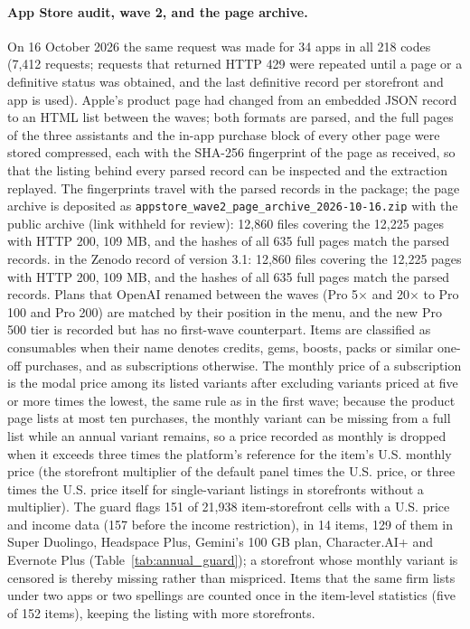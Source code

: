 \documentclass[11pt]{article}
\theoremstyle{definition}
\theoremstyle{remark}
\begin{document}
\paragraph{App Store audit, wave 2, and the page archive.} On 16 October 2026 the same request was made for 34 apps in all 218 codes (7,412 requests; requests that returned HTTP 429 were repeated until a page or a definitive status was obtained, and the last definitive record per storefront and app is used). Apple's product page had changed from an embedded JSON record to an HTML list between the waves; both formats are parsed, and the full pages of the three assistants and the in-app purchase block of every other page were stored compressed, each with the SHA-256 fingerprint of the page as received, so that the listing behind every parsed record can be inspected and the extraction replayed. The fingerprints travel with the parsed records in the package; the page archive is deposited as \texttt{appstore\_wave2\_page\_archive\_2026-10-16.zip}
\ifanon
with the public archive (link withheld for review): 12,860 files covering the 12,225 pages with HTTP 200, 109 MB, and the hashes of all 635 full pages match the parsed records.
\else
in the Zenodo record of version 3.1: 12,860 files covering the 12,225 pages with HTTP 200, 109 MB, and the hashes of all 635 full pages match the parsed records.
\fi
Plans that OpenAI renamed between the waves (Pro 5$\times$ and 20$\times$ to Pro 100 and Pro 200) are matched by their position in the menu, and the new Pro 500 tier is recorded but has no first-wave counterpart. Items are classified as consumables when their name denotes credits, gems, boosts, packs or similar one-off purchases, and as subscriptions otherwise. The monthly price of a subscription is the modal price among its listed variants after excluding variants priced at five or more times the lowest, the same rule as in the first wave; because the product page lists at most ten purchases, the monthly variant can be missing from a full list while an annual variant remains, so a price recorded as monthly is dropped when it exceeds three times the platform's reference for the item's U.S. monthly price (the storefront multiplier of the default panel times the U.S. price, or three times the U.S. price itself for single-variant listings in storefronts without a multiplier). The guard flags 151 of 21,938 item-storefront cells with a U.S. price and income data (157 before the income restriction), in 14 items, 129 of them in Super Duolingo, Headspace Plus, Gemini's 100 GB plan, Character.AI+ and Evernote Plus (Table~\ref{tab:annual_guard}); a storefront whose monthly variant is censored is thereby missing rather than mispriced. Items that the same firm lists under two apps or two spellings are counted once in the item-level statistics (five of 152 items), keeping the listing with more storefronts.
\end{document}
